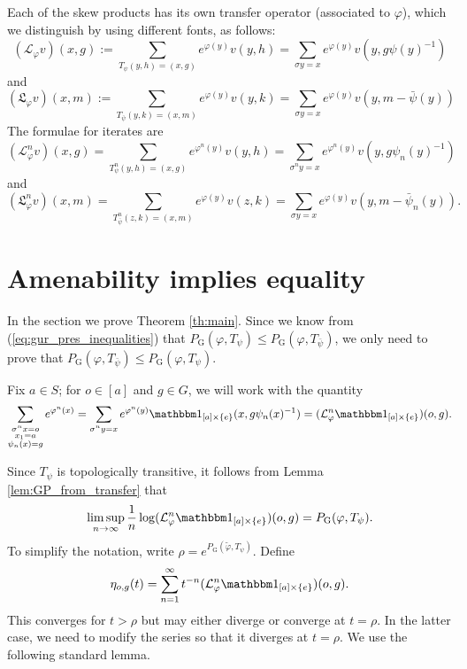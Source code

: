\documentclass[11pt,letterpaper]{amsart}
\theoremstyle{definition}
\numberwithin{equation}{section}
\numberwithin{theorem}{section}
\def\vp{\varphi}
\def\PG{P_{\mathrm{G}}}
\begin{document}
Each of the skew products has its own transfer operator (associated to $\vp$),
which we distinguish by using different fonts, as follows:
\[
(\mathcal L_{\vp}v)(x,g) := \sum_{T_\psi(y,h) = (x,g)} e^{\vp(y)} v(y,h)
= \sum_{\sigma y=x} e^{\vp(y)} v(y,g\psi(y)^{-1})
\]
and
\[
(\mathfrak L_{\vp}v)(x,m) := \sum_{T_{\bar \psi}(y,k) = (x,m)} e^{\vp(y)} v(y,k)
= \sum_{\sigma y=x} e^{\vp(y)} v(y,m-\bar \psi(y))
\]
The formulae for iterates are
\[
(\mathcal L_{\vp}^nv)(x,g) =
\sum_{T_\psi^n(y,h)=(x,g)} e^{\vp^n(y)} v(y,h)
=\sum_{\sigma^n y=x} e^{\vp^n(y)}
v(y,g\psi_n(y)^{-1})
\]
and
\[
(\mathfrak L_{\vp}^n v)(x,m) = \sum_{T_{\bar \psi}^n(z,k) = (x,m)} e^{\vp(y)} v(z,k)
= \sum_{\sigma y=x} e^{\vp(y)} v(y,m-\bar \psi_n(y)).
\]



\section{Amenability implies equality} \label{sec:am imp eq}

In the section we prove Theorem \ref{th:main}. Since we know from (\ref{eq:gur_pres_inequalities}) that
$\PG(\vp,T_\psi) \le \PG(\vp,T_{\bar \psi})$, we only
need to prove that $\PG(\vp,T_{\bar \psi}) \le \PG(\vp,T_\psi)$.





Fix $a \in S$; for $o \in [a]$ and $g \in G$, we will work with the quantity
\[
\sum_{\substack{\sigma^n x=o \\x_1=a\\ \psi_n(x)=g}} e^{\vp^n(x)}
=
\sum_{\substack{\sigma^n y=x}} e^{\vp^n(y)} \mathbbm 1_{[a] \times \{e\}}(x,g\psi_n(x)^{-1})
= (\mathcal L_{\vp}^n \mathbbm 1_{[a] \times \{e\}})(o,g).
\]

Since $T_\psi$ is topologically transitive, it follows from Lemma 
\ref{lem:GP_from_transfer} that
\begin{equation}\label{eq:GP_from_transfer_G}
\limsup_{n \to \infty} \frac{1}{n} \log (\mathcal L_{\vp}^n \mathbbm 1_{[a] \times \{e\}})(o,g)
= \PG(\vp,T_\psi).
\end{equation}
To simplify the notation, write $\rho = e^{\PG(\tilde \vp,T_\psi)}$. Define
\[
\eta_{o,g}(t) = \sum_{n=1}^\infty t^{-n} (\mathcal L_{\vp}^n\mathbbm 1_{[a] \times \{e\}})(o,g).
\]
This converges for $t>\rho$ but may either diverge or converge at $t=\rho$. In the latter case, we need to modify the series so that it diverges at $t=\rho$. We use the following standard lemma.
\end{document}
